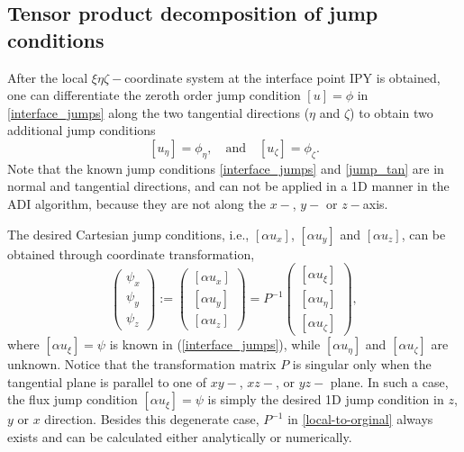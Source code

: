 \documentclass[dissertation]{uathesis}
\begin{document}
\begin{body}
\begin{flushleft}
\subsection{Tensor product decomposition of jump conditions}
\hspace{1cm} After the local $\xi \eta \zeta -$coordinate system at the interface point IPY is obtained, one can differentiate the zeroth order jump condition $[u]=\phi$ in \eqref{interface_jumps} along the two tangential directions ($\eta$ and $\zeta$) to obtain two additional jump conditions 
\begin{equation}\label{jump_tan}
[u_{\eta}] = \phi_{\eta}, \quad \mbox{and} \quad [u_{\zeta}] = \phi_{\zeta}.
\end{equation}
Note that the known jump conditions \eqref{interface_jumps} and \eqref{jump_tan} 
are in normal and tangential directions, and can not be applied in a 1D manner
in the ADI algorithm, because they are not along the $x-$, $y-$ or $z-$axis. 

\hspace{1cm} The desired Cartesian jump conditions, i.e., $[\alpha u_{x}]$, $[\alpha u_{y}]$ and $[\alpha u_{z}]$, can be obtained through coordinate transformation, 
%
\begin{equation} \label{local-to-orginal}
\begin{pmatrix}
\psi_{x}    \\
\psi_{y}    \\
\psi_{z}
\end{pmatrix}
:=
\begin{pmatrix}
[\alpha u_{x}]   \\
[\alpha u_{y}]   \\
[\alpha u_{z}]
\end{pmatrix}
=
P^{-1}
\begin{pmatrix}
[\alpha u_{\xi}]    \\
[\alpha u_{\eta}]   \\
[\alpha u_{\zeta}]
\end{pmatrix},
\end{equation}
%
where $[\alpha u_{\xi}] = \psi$ is known in (\ref{interface_jumps}), while  $[\alpha u_{\eta}]$ and $[\alpha u_{\zeta}]$ are unknown. 
Notice that the transformation matrix $P$ is singular only when the tangential plane is parallel to one of $xy-$, $xz-$, or $yz-$ plane. In such a case, the flux jump condition $[\alpha u_{\xi}] = \psi$ is simply the desired 1D jump condition in $z$, $y$ or $x$ direction. Besides this degenerate case, $P^{-1}$ in \eqref{local-to-orginal} always exists and can be calculated either analytically or numerically.


\end{flushleft}
\end{body}
\end{document}
